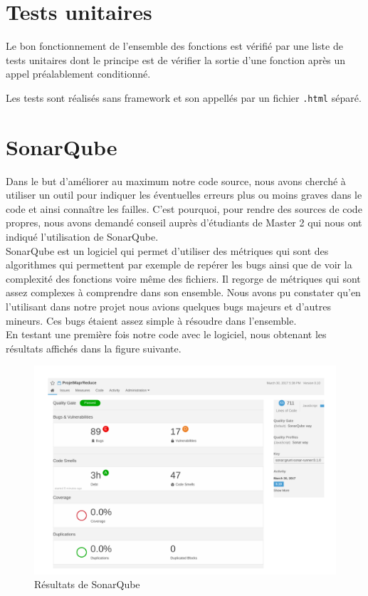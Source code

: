 \section{Tests unitaires}

Le bon fonctionnement de l'ensemble des fonctions est vérifié par une liste de tests unitaires dont le principe est de vérifier la sortie d'une fonction après un appel préalablement conditionné.

Les tests sont réalisés sans framework et son appellés par un fichier \texttt{.html} séparé.



\section{SonarQube}
Dans le but d'améliorer au maximum notre code source, nous avons cherché à utiliser un outil pour indiquer les éventuelles erreurs plus ou moins graves dans le code et ainsi connaître les failles. C'est pourquoi, pour rendre des sources de code propres, nous avons demandé conseil auprès d'étudiants de Master 2 qui nous ont indiqué l'utilisation de SonarQube.\\

SonarQube est un logiciel qui permet d'utiliser des métriques qui sont des algorithmes qui permettent par exemple de repérer les bugs ainsi que de voir la complexité des fonctions voire même des fichiers. Il regorge de métriques qui sont assez complexes à comprendre dans son ensemble. Nous avons pu constater qu'en l'utilisant dans notre projet nous avions quelques bugs majeurs et d'autres mineurs. Ces bugs étaient assez simple à résoudre dans l'ensemble.\\

En testant une première fois notre code avec le logiciel, nous obtenant les résultats affichés dans la figure suivante.

\begin{figure}[H]
  \centering
    \includegraphics[scale=0.7]{images/sonarqube.pdf}
        \caption{Résultats de SonarQube}
\end{figure}

